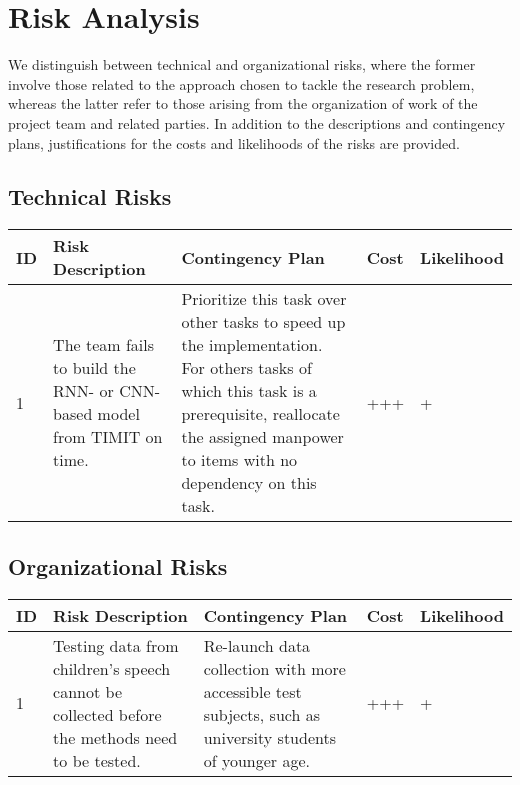 \section{Risk Analysis}
\label{sec:risk}

We distinguish between technical and organizational risks, where the former involve those related to the approach chosen to tackle the research problem, whereas the latter refer to those arising from the organization of work of the project team and related parties. In addition to the descriptions and contingency plans, justifications for the costs and likelihoods of the risks are provided.

\subsection{Technical Risks}
\begin{center} 
	\small
	\begin{tabular}{  p{} p{} p{} p{} p{} }
		\toprule
		\textbf{ID} & \textbf{Risk Description} & \textbf{Contingency Plan} & \textbf{Cost} & \textbf{Likelihood} 		 \\ 
		\midrule
		1 & 
		The team fails to build the RNN- or CNN-based model from TIMIT on time. &
		Prioritize this task over other tasks to speed up the implementation. For others tasks of which this task is a prerequisite, reallocate the assigned manpower to items with no dependency on this task.  &
		+++ &
		+  \\
		\bottomrule
	\end{tabular}
\end{center}

\subsection{Organizational Risks}

\begin{center} 
	\small
	\begin{tabular}{  p{} p{} p{} p{} p{} }
		\toprule
		\textbf{ID} & \textbf{Risk Description} & \textbf{Contingency Plan} & \textbf{Cost} & \textbf{Likelihood} 		 \\ 
		\midrule
		1 & 
		Testing data from children’s speech cannot be collected before the methods need to be tested. &
		Re-launch data collection with more accessible test subjects, such as university students of younger age. &
		+++ &
		+  \\
		\bottomrule
	\end{tabular}
\end{center}

